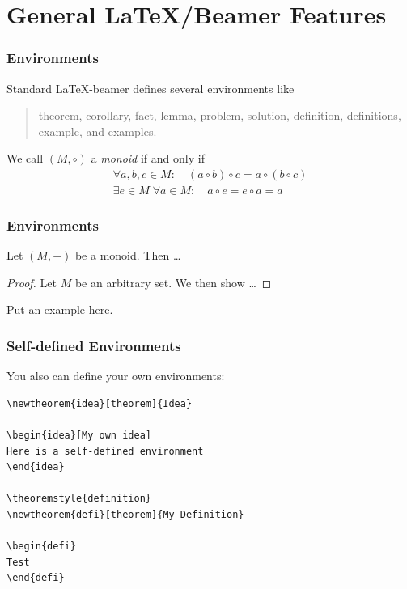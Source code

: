\documentclass[utf8,aspectratio=169,ngerman,english]{beamer}
\begin{document}
\section{General \LaTeX/Beamer Features}


\begin{frame}
\frametitle{Environments}

Standard \LaTeX-beamer defines several environments like
\begin{quote}
theorem, corollary, fact, lemma, problem, solution, definition, definitions, example, and examples.
\end{quote}

\begin{definition}[Monoid]
We call $(M,\circ)$ a \emph{monoid} if and only if
\begin{gather*}
\forall a,b,c\in M:\quad(a\circ b)\circ c = a\circ(b\circ c) \tag{associativity}\\
\exists e\in M \;\forall a\in M:\quad a\circ e = e\circ a= a \tag{neutral element}
\end{gather*}
\end{definition}
\end{frame}

\begin{frame}
\frametitle{Environments}

\begin{theorem}
Let $(M,+)$ be a monoid. Then \ldots
\end{theorem}

\begin{proof}
Let $M$ be an arbitrary set. We then show \ldots
\end{proof}

\begin{example}
Put an example here.
\end{example}
\end{frame}


\begin{frame}[fragile]
\frametitle{Self-defined Environments}

You also can define your own environments:
\begin{lstlisting}[language={[LaTeX]TeX},numbers=none]
\newtheorem{idea}[theorem]{Idea}

\begin{idea}[My own idea]
Here is a self-defined environment
\end{idea}

\theoremstyle{definition}
\newtheorem{defi}[theorem]{My Definition}

\begin{defi}
Test
\end{defi}
\end{lstlisting}
\end{frame}
\end{document}
